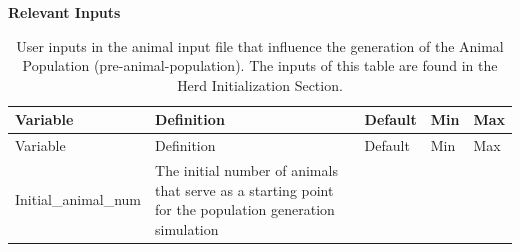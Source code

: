 \documentclass[
  letterpaper,
  oneside,
  openany]{scrbook}
\begin{document}
\textbf{Relevant Inputs}

\begin{longtable}[]{@{}
  >{\raggedright\arraybackslash}p{}
  >{\raggedright\arraybackslash}p{}
  >{\raggedright\arraybackslash}p{}
  >{\raggedright\arraybackslash}p{}
  >{\raggedright\arraybackslash}p{}@{}}
\caption{User inputs in the animal input file that influence the
generation of the Animal Population (pre-animal-population). The inputs
of this table are found in the Herd Initialization
Section.}\label{tbl-animal-herd-inputs}\tabularnewline
\toprule\noalign{}
\begin{minipage}[b]{\linewidth}\raggedright
Variable
\end{minipage} & \begin{minipage}[b]{\linewidth}\raggedright
Definition
\end{minipage} & \begin{minipage}[b]{\linewidth}\raggedright
Default
\end{minipage} & \begin{minipage}[b]{\linewidth}\raggedright
Min
\end{minipage} & \begin{minipage}[b]{\linewidth}\raggedright
Max
\end{minipage} \\
\midrule\noalign{}
\endfirsthead
\toprule\noalign{}
\begin{minipage}[b]{\linewidth}\raggedright
Variable
\end{minipage} & \begin{minipage}[b]{\linewidth}\raggedright
Definition
\end{minipage} & \begin{minipage}[b]{\linewidth}\raggedright
Default
\end{minipage} & \begin{minipage}[b]{\linewidth}\raggedright
Min
\end{minipage} & \begin{minipage}[b]{\linewidth}\raggedright
Max
\end{minipage} \\
\midrule\noalign{}
\endhead
\bottomrule\noalign{}
\endlastfoot
Initial\_animal\_num & The initial number of animals that serve as a
starting point for the population generation simulation & 10000 & 0 &

\end{longtable}
\end{document}
